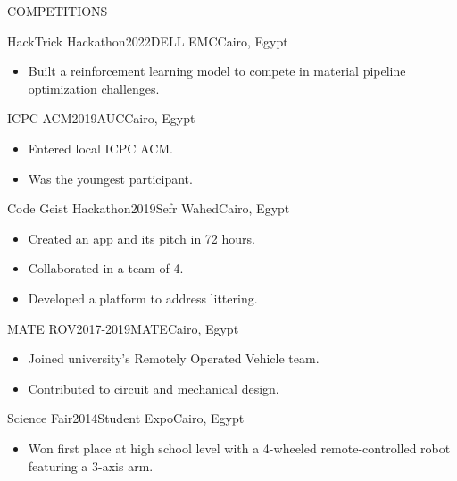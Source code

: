 \documentclass{resume}
\begin{document}
\begin{minipage}[t]{0.49\textwidth}

	\begin{rsection}{\MakeUppercase{competitions}}{}

		\begin{rcontent}{HackTrick Hackathon}{2022}{DELL EMC}{Cairo, Egypt}
			\begin{itemize}
				\item Built a reinforcement learning model to compete in material pipeline optimization challenges.
			\end{itemize}
		\end{rcontent}
		\divider
		\begin{rcontent}{ICPC ACM}{2019}{AUC}{Cairo, Egypt}
			\begin{itemize}
				\item Entered local ICPC ACM.
				\item Was the youngest participant.
			\end{itemize}
		\end{rcontent}
		\divider
		\begin{rcontent}{Code Geist Hackathon}{2019}{Sefr Wahed}{Cairo, Egypt}
			\begin{itemize}
				\item Created an app and its pitch in 72 hours.
				\item Collaborated in a team of 4.
				\item Developed a platform to address littering.
			\end{itemize}
		\end{rcontent}
		\divider
		\begin{rcontent}{MATE ROV}{2017-2019}{MATE}{Cairo, Egypt}
			\begin{itemize}
				\item Joined university's Remotely Operated Vehicle team.
				\item Contributed to circuit and mechanical design.
			\end{itemize}
		\end{rcontent}
		\divider
		\begin{rcontent}{Science Fair}{2014}{Student Expo}{Cairo, Egypt}
			\begin{itemize}
				\item Won first place at high school level with a 4-wheeled remote-controlled robot featuring a 3-axis arm.
			\end{itemize}
		\end{rcontent}
	\end{rsection}


\end{minipage}
\end{document}
